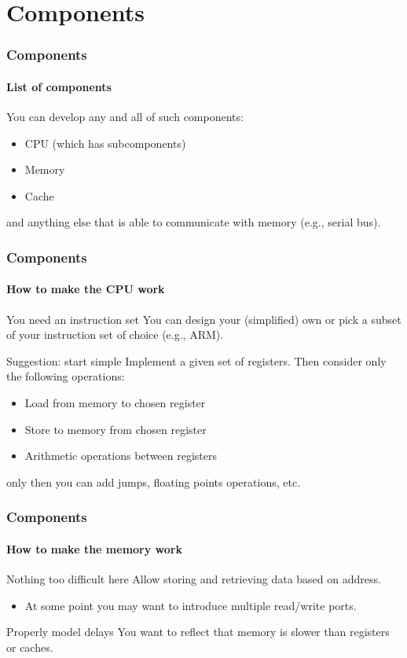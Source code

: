 \section{Components}

\begin{frame}
\frametitle{Components}
\framesubtitle{List of components}

\begin{block}{You can develop any and all of such components:}
\begin{itemize}
\item CPU (which has subcomponents)
\item Memory
\item Cache
\end{itemize}
and anything else that is able to communicate with memory (e.g., serial bus).
\end{block}
\end{frame}

\begin{frame}
\frametitle{Components}
\framesubtitle{How to make the CPU work}

\begin{block}{You need an instruction set}
You can design your (simplified) own or pick a subset of your instruction set of choice (e.g., ARM).
\end{block}
\pause
\begin{block}{Suggestion: start simple}
Implement a given set of registers. Then consider only the following operations:
\begin{itemize}
\item Load from memory to chosen register
\item Store to memory from chosen register
\item Arithmetic operations between registers
\end{itemize}
only then you can add jumps, floating points operations, etc.
\end{block}
\end{frame}

\begin{frame}
\frametitle{Components}
\framesubtitle{How to make the memory work}

\begin{block}{Nothing too difficult here}
Allow storing and retrieving data based on address.
\begin{itemize}
\item At some point you may want to introduce multiple read/write ports.
\end{itemize}
\end{block}
\pause
\begin{block}{Properly model delays}
You want to reflect that memory is slower than registers or caches.
\end{block}
\end{frame}

